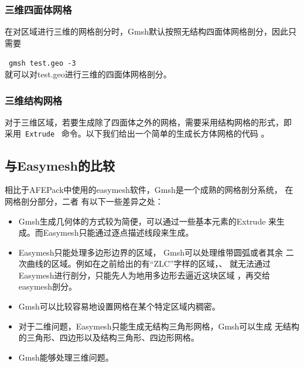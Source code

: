 \documentclass[a4paper,  11pt]{ctexart}
\newcommand\inputccode[1]{}
\begin{document}
\subsubsection{三维四面体网格}
在对区域进行三维的网格剖分时，Gmsh默认按照无结构四面体网格剖分，因此只
需要\par
~\verb|gmsh test.geo -3|~ \\
就可以对test.geo进行三维的四面体网格剖分。
\subsubsection{三维结构网格}
对于三维区域，若要生成除了四面体之外的网格，需要采用结构网格的形式，即
采用~\verb|Extrude|~ 命令。以下我们给出一个简单的生成长方体网格的代码
。
\inputccode{cuboid.geo}
\begin{figure}[H]
	\centering
\end{figure}
\subsection{与Easymesh的比较}
相比于AFEPack中使用的easymesh软件，Gmsh是一个成熟的网格剖分系统，
在网格剖分部分，二者
有以下一些差异之处：
\begin{itemize}
	\item Gmsh生成几何体的方式较为简便，可以通过一些基本元素的Extrude
		来生成。而Easymesh只能通过逐点描述线段来生成。
	\item Easymesh只能处理多边形边界的区域，
		Gmsh可以处理维带圆弧或者其余
		二次曲线的区域。例如在之前给出的有“ZLC”字样的区域，、
		就无法通过Easymesh进行剖分，只能先人为地用多边形去逼近这块区域
		，再交给easymesh剖分。
	\item Gmsh可以比较容易地设置网格在某个特定区域内稠密。
	\item 对于二维问题，Easymesh只能生成无结构三角形网格，Gmsh可以生成
		无结构的三角形、四边形以及结构三角形、四边形网格。
	\item Gmsh能够处理三维问题。
\end{itemize}
\newpage
\end{document}

